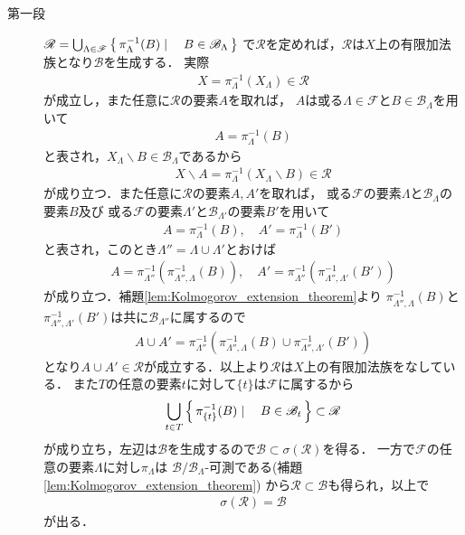 	\begin{prf}\mbox{}
		\begin{description}
			\item[第一段]
				$\mathscr{R} = \bigcup_{\Lambda\in\mathscr{F}} \left\{\, \pi_\Lambda^{-1}(B) \mid \quad B \in \mathscr{B}_\Lambda\, \right\}$
				で$\mathscr{R}$を定めれば，$\mathscr{R}$は$X$上の有限加法族となり$\mathscr{B}$を生成する．
				実際
				\begin{align}
					X = \pi_\Lambda^{-1}(X_\Lambda) \in \mathscr{R}
				\end{align}
				が成立し，また任意に$\mathscr{R}$の要素$A$を取れば，
				$A$は或る$\Lambda \in \mathscr{F}$と$B \in \mathscr{B}_\Lambda$を用いて
				\begin{align}
					A = \pi_\Lambda^{-1}(B)
				\end{align}
				と表され，$X_\Lambda \backslash B \in \mathscr{B}_\Lambda$であるから
				\begin{align}
					X \backslash A = \pi_\Lambda^{-1}(X_\Lambda \backslash B) \in \mathscr{R}
				\end{align}
				が成り立つ．また任意に$\mathscr{R}$の要素$A,A'$を取れば，
				或る$\mathscr{F}$の要素$\Lambda$と$\mathscr{B}_\Lambda$の要素$B$及び
				或る$\mathscr{F}$の要素$\Lambda'$と$\mathscr{B}_{\Lambda'}$の要素$B'$を用いて
				\begin{align}
					A = \pi_\Lambda^{-1}(B),\quad A' = \pi_\Lambda^{-1}(B')
				\end{align}
				と表され，このとき$\Lambda'' = \Lambda \cup \Lambda'$とおけば
				\begin{align}
					A = \pi_{\Lambda''}^{-1}\left(\pi_{\Lambda'',\Lambda}^{-1}(B)\right),
					\quad A' = \pi_{\Lambda''}^{-1}\left(\pi_{\Lambda'',\Lambda'}^{-1}(B')\right)
				\end{align}
				が成り立つ．補題\ref{lem:Kolmogorov_extension_theorem}より
				$\pi_{\Lambda'',\Lambda}^{-1}(B)$と$\pi_{\Lambda'',\Lambda'}^{-1}(B')$は共に$\mathscr{B}_{\Lambda''}$に属するので
				\begin{align}
					A \cup A' =  \pi_{\Lambda''}^{-1}\left(\pi_{\Lambda'',\Lambda}^{-1}(B) \cup 
					\pi_{\Lambda'',\Lambda'}^{-1}(B')\right)
				\end{align}
				となり$A \cup A' \in \mathscr{R}$が成立する．以上より$\mathscr{R}$は$X$上の有限加法族をなしている．
				また$T$の任意の要素$t$に対して$\{t\}$は$\mathscr{F}$に属するから
				\begin{align}
					\bigcup_{t \in T}\left\{\, \pi_{\{t\}}^{-1}(B) \mid \quad B \in \mathscr{B}_t\, \right\} \subset \mathscr{R}
				\end{align}
				が成り立ち，左辺は$\mathscr{B}$を生成するので$\mathscr{B} \subset \sigma(\mathscr{R})$を得る．
				一方で$\mathscr{F}$の任意の要素$\Lambda$に対し$\pi_\Lambda$は
				$\mathscr{B}/\mathscr{B}_\Lambda$-可測である(補題\ref{lem:Kolmogorov_extension_theorem})
				から$\mathscr{R} \subset \mathscr{B}$も得られ，以上で
				\begin{align}
					\sigma(\mathscr{R}) = \mathscr{B}
				\end{align}
				が出る．
				

\end{description}
\end{prf}

